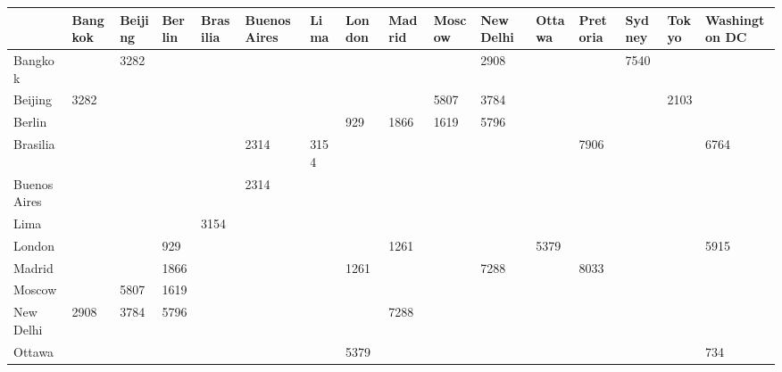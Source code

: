 \begin{tabular}{l|lllllllllllllll}\hline
              & Bangkok & Beijing & Berlin & Brasilia & Buenos Aires  & Lima & London & Madrid & Moscow & New Delhi & Ottawa & Pretoria & Sydney & Tokyo & Washington DC \\\hline
Bangkok       &         & 3282    &        &          &               &      &        &        &        & 2908      &        &          & 7540   &       &               \\[4pt] 
Beijing       & 3282    &         &        &          &               &      &        &        & 5807   & 3784      &        &          &        & 2103  &               \\[4pt]
Berlin        &         &         &        &          &               &      & 929    & 1866   & 1619   & 5796      &        &          &        &       &               \\[4pt]
Brasilia      &         &         &        &          & 2314          & 3154 &        &        &        &           &        & 7906     &        &       & 6764          \\[4pt]
Buenos Aires  &         &         &        &          & 2314          &      &        &        &        &           &        &          &        &       &               \\[4pt]
Lima          &         &         &        & 3154     &               &      &        &        &        &           &        &          &        &       &               \\[4pt]
London        &         &         & 929    &          &               &      &        & 1261   &        &           & 5379   &          &        &       & 5915          \\[4pt]
Madrid        &         &         & 1866   &          &               &      & 1261   &        &        & 7288      &        & 8033     &        &       &               \\[4pt]
Moscow        &         & 5807    & 1619   &          &               &      &        &        &        &           &        &          &        &       &               \\[4pt]
New Delhi     & 2908    & 3784    & 5796   &          &               &      &        & 7288   &        &           &        &          &        &       &               \\[4pt]
Ottawa        &         &         &        &          &               &      & 5379   &        &        &           &        &          &        &       & 734           \\[4pt]

\end{tabular}
